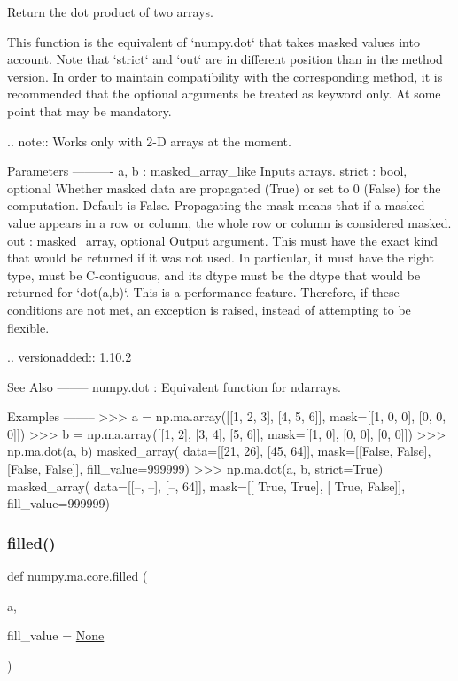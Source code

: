 \begin{DoxyVerb}Return the dot product of two arrays.

This function is the equivalent of `numpy.dot` that takes masked values
into account. Note that `strict` and `out` are in different position
than in the method version. In order to maintain compatibility with the
corresponding method, it is recommended that the optional arguments be
treated as keyword only.  At some point that may be mandatory.

.. note::
  Works only with 2-D arrays at the moment.


Parameters
----------
a, b : masked_array_like
    Inputs arrays.
strict : bool, optional
    Whether masked data are propagated (True) or set to 0 (False) for
    the computation. Default is False.  Propagating the mask means that
    if a masked value appears in a row or column, the whole row or
    column is considered masked.
out : masked_array, optional
    Output argument. This must have the exact kind that would be returned
    if it was not used. In particular, it must have the right type, must be
    C-contiguous, and its dtype must be the dtype that would be returned
    for `dot(a,b)`. This is a performance feature. Therefore, if these
    conditions are not met, an exception is raised, instead of attempting
    to be flexible.

    .. versionadded:: 1.10.2

See Also
--------
numpy.dot : Equivalent function for ndarrays.

Examples
--------
>>> a = np.ma.array([[1, 2, 3], [4, 5, 6]], mask=[[1, 0, 0], [0, 0, 0]])
>>> b = np.ma.array([[1, 2], [3, 4], [5, 6]], mask=[[1, 0], [0, 0], [0, 0]])
>>> np.ma.dot(a, b)
masked_array(
  data=[[21, 26],
        [45, 64]],
  mask=[[False, False],
        [False, False]],
  fill_value=999999)
>>> np.ma.dot(a, b, strict=True)
masked_array(
  data=[[--, --],
        [--, 64]],
  mask=[[ True,  True],
        [ True, False]],
  fill_value=999999)\end{DoxyVerb}
 \mbox{\label{namespacenumpy_1_1ma_1_1core_a9256ccefed32dab91d0128962fdfdf88}} 
\subsubsection{\texorpdfstring{filled()}{filled()}}
{\footnotesize\ttfamily def numpy.\+ma.\+core.\+filled (\begin{DoxyParamCaption}\item[{}]{a,  }\item[{}]{fill\+\_\+value = {\ttfamily \hyperlink{namespacenumpy_1_1ma_1_1core_a647ee1848dfa3692fe35a663a2aa40b3}{None}} }\end{DoxyParamCaption})}

